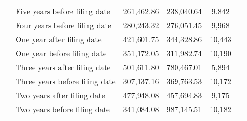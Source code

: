 \begin{tabular}{llcccc}
 & Five years before filing date & 261,462.86 & 238,040.64 & 9,842 \\
 & Four years before filing date & 280,243.32 & 276,051.45 & 9,968 \\
 & One year after filing date & 421,601.75 & 344,328.86 & 10,443 \\
 & One year before filing date & 351,172.05 & 311,982.74 & 10,190 \\
 & Three years after filing date & 501,611.80 & 780,467.01 & 5,894 \\
 & Three years before filing date & 307,137.16 & 369,763.53 & 10,172 \\
 & Two years after filing date & 477,948.08 & 457,694.83 & 9,175 \\
 & Two years before filing date & 341,084.08 & 987,145.51 & 10,182 \\
\cline{1-5}
\bottomrule
\end{tabular}
